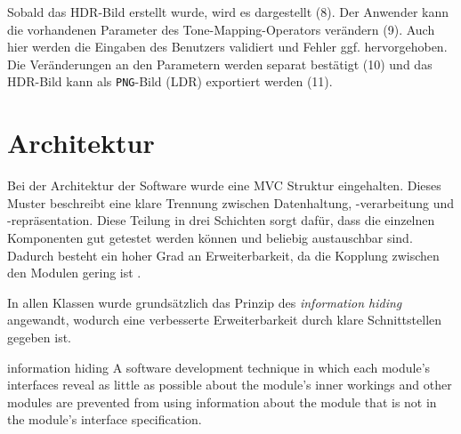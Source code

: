Sobald das \gls{HDR}-Bild erstellt wurde, wird es dargestellt (8). Der Anwender kann die vorhandenen Parameter des \gls{Tone-Mapping}-Operators verändern (9). Auch hier werden die Eingaben des Benutzers validiert und Fehler ggf. hervorgehoben. Die Veränderungen an den Parametern werden separat bestätigt (10) und das \gls{HDR}-Bild kann als  \texttt{PNG}-Bild (\gls{LDR}) exportiert werden (11).





\section{Architektur}
\label{sec:architektur}
Bei der Architektur der Software wurde eine \gls{MVC} Struktur eingehalten. Dieses Muster beschreibt eine klare Trennung zwischen Datenhaltung, -verarbeitung und -repräsentation. Diese Teilung in drei Schichten sorgt dafür, dass die einzelnen Komponenten gut getestet werden können und beliebig austauschbar sind. Dadurch besteht ein hoher Grad an Erweiterbarkeit, da die Kopplung zwischen den Modulen gering ist \cite[S.~413]{ludewig}.

In allen Klassen wurde grundsätzlich das Prinzip des \textit{information hiding} angewandt, wodurch eine verbesserte Erweiterbarkeit durch klare Schnittstellen gegeben ist.

\begin{ieee}{information hiding}
A software development technique in which each module's interfaces reveal as little as possible about the module's inner workings and other modules are prevented from using information about the module that is not in the module's interface specification.
\end{ieee}

